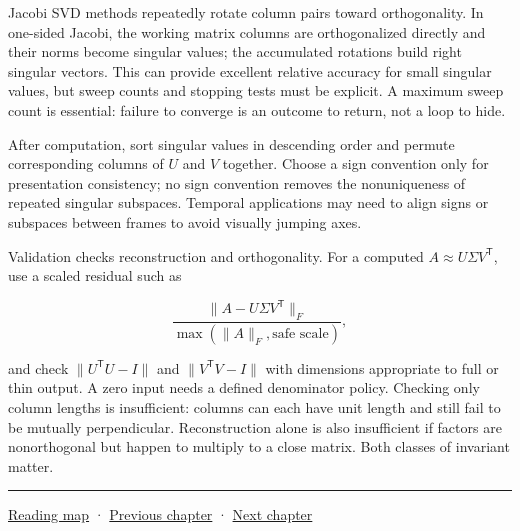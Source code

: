 Jacobi SVD methods repeatedly rotate column pairs toward orthogonality. In one-sided Jacobi, the working matrix columns are orthogonalized directly and their norms become singular values; the accumulated rotations build right singular vectors. This can provide excellent relative accuracy for small singular values, but sweep counts and stopping tests must be explicit. A maximum sweep count is essential: failure to converge is an outcome to return, not a loop to hide.

After computation, sort singular values in descending order and permute corresponding columns of \(U\) and \(V\) together. Choose a sign convention only for presentation consistency; no sign convention removes the nonuniqueness of repeated singular subspaces. Temporal applications may need to align signs or subspaces between frames to avoid visually jumping axes.

Validation checks reconstruction and orthogonality. For a computed \(A\approx U\Sigma V^\mathsf T\), use a scaled residual such as

\[
\frac{\|A-U\Sigma V^\mathsf T\|_F}
{\max(\|A\|_F,\text{safe scale})},
\]

and check \(\|U^\mathsf TU-I\|\) and \(\|V^\mathsf TV-I\|\) with dimensions appropriate to full or thin output. A zero input needs a defined denominator policy. Checking only column lengths is insufficient: columns can each have unit length and still fail to be mutually perpendicular. Reconstruction alone is also insufficient if factors are nonorthogonal but happen to multiply to a close matrix. Both classes of invariant matter.

\begin{center}\rule{0.5\linewidth}{0.5pt}\end{center}

\hyperref[volume-reading-map]{Reading map} · \hyperref[02-foundations-ii-ch023-probability-models-and-measurement-error]{Previous chapter} · \hyperref[02-foundations-ii-ch025-continuous-models-and-numerical-error]{Next chapter}
